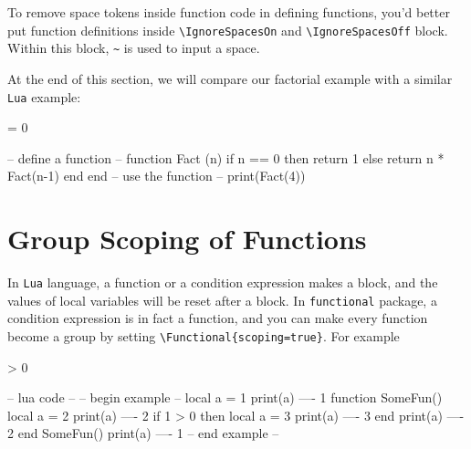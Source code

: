 \documentclass[oneside]{book}
\begin{document}
To remove space tokens inside function code in defining functions,
you'd better put function definitions inside \verb!\IgnoreSpacesOn! and
\verb!\IgnoreSpacesOff! block. Within this block, \verb!~! is used to input a space.

At the end of this section,
we will compare our factorial example with a similar \verb!Lua! example:

\begin{minipage}{0.69\textwidth}
\begin{codehigh}
\IgnoreSpacesOn
\PrgNewFunction {} {
   = {0} {
  }{
  }
}
\IgnoreSpacesOff
{}
\end{codehigh}
\end{minipage}%
\begin{minipage}{0.31\textwidth}
\begin{code}
-- define a function --
function Fact (n)
  if n == 0 then
    return 1
  else
    return n * Fact(n-1)
  end
end
-- use the function --
print(Fact(4))
\end{code}
\end{minipage}


\section{Group Scoping of Functions}

In \verb!Lua! language, a function or a condition expression makes a block,
and the values of local variables will be reset after a block.
In \verb!functional! package, a condition expression is in fact a function,
and you can make every function become a group by setting
\verb!\Functional{scoping=true}!. For example

\begin{minipage}{0.58\textwidth}
\begin{codehigh}
\IgnoreSpacesOn
\IntSet {}
\IntVarLog \lTmpaInt            %
\PrgNewFunction \SomeFun { } {
  \IntSet {}
  \IntVarLog \lTmpaInt          %
   > {0} {
    \IntSet {}
    \IntVarLog \lTmpaInt        %
  }{ }
  \IntVarLog \lTmpaInt          %
}
\SomeFun
\IntVarLog \lTmpaInt            %
\IgnoreSpacesOff
\end{codehigh}
\end{minipage}%
\begin{minipage}{0.42\textwidth}
\begin{code}
-- lua code --
-- begin example --
local a = 1
print(a)            ---- 1
function SomeFun()
  local a = 2
  print(a)          ---- 2
  if 1 > 0 then
    local a = 3
    print(a)        ---- 3
  end
  print(a)          ---- 2
end
SomeFun()
print(a)            ---- 1
-- end example --
\end{code}
\end{minipage}
\end{document}
